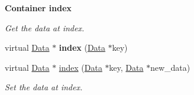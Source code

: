 \begin{Indent}{\bf Container index}\par
{\em Get the data at index. }\begin{DoxyCompactItemize}
\item 
virtual \hyperlink{classcreek_1_1_data}{Data} $\ast$ {\bfseries index} (\hyperlink{classcreek_1_1_data}{Data} $\ast$key)\hypertarget{classcreek_1_1_data_a254ea02d0515fc81c253bd88d77e7ae8}{}\label{classcreek_1_1_data_a254ea02d0515fc81c253bd88d77e7ae8}

\item 
virtual \hyperlink{classcreek_1_1_data}{Data} $\ast$ \hyperlink{classcreek_1_1_data_a5ca017d9e4f7de20e7924079e149f2ad}{index} (\hyperlink{classcreek_1_1_data}{Data} $\ast$key, \hyperlink{classcreek_1_1_data}{Data} $\ast$new\+\_\+data)\hypertarget{classcreek_1_1_data_a5ca017d9e4f7de20e7924079e149f2ad}{}\label{classcreek_1_1_data_a5ca017d9e4f7de20e7924079e149f2ad}

\begin{DoxyCompactList}\small\item\em Set the data at index. \end{DoxyCompactList}\end{DoxyCompactItemize}
\end{Indent}
